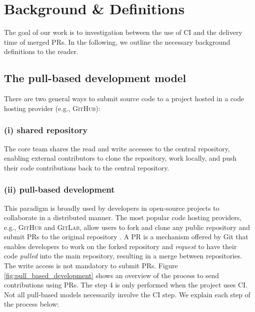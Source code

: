 \section{Background \& Definitions}
\label{sec_background_and_definitions}

The goal of our work is to investigation between the use of CI and the delivery time of merged PRs. In the following, we outline the necessary background definitions to the reader.

\subsection{\textbf{The pull-based development model}}
\label{subsec:the_pull_based_model}


There are two general ways to submit source code to a project hosted in a code hosting provider (e.g., \textsc{GitHub}):

\subsubsection*{\textbf{(i) shared repository}} The core team shares the read and write accesses to the central repository, enabling external contributors to clone the repository, work locally, and push their code contributions back to the central repository.  

\subsubsection*{\textbf{(ii) pull-based development}} This paradigm is broadly used by developers in open-source projects to collaborate in a distributed manner. The most popular code hosting providers, e.g., \textsc{GitHub} and \textsc{GitLab}, allow users to fork and clone any public repository and submit PRs to the original repository \citep{Gousios2014-ao}. A PR is a mechanism offered by Git that enables developers to work on the forked repository and {\em request} to have their code {\em pulled} into the main repository, resulting in a merge between repositories. The write access is not mandatory to submit PRs.  Figure \ref{fig:pull_based_development} shows an overview of the process to send contributions using PRs. The step 4 is only performed when the project uses CI. Not all pull-based models necessarily involve the CI step. We explain each step
of the process below: 

